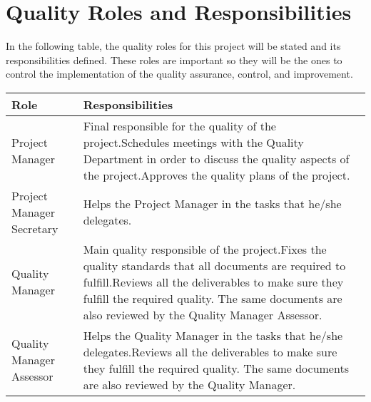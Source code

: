 \section{Quality Roles and Responsibilities}
In the following table, the quality roles for this project will be stated and its responsibilities defined. These roles are important so they will be the ones to control the implementation of the quality assurance, control, and improvement.

\begin{longtable}[H]{>{\raggedright\arraybackslash}p{5cm} p{9cm}}
	
	\toprule[2pt]
	
	\textbf{Role} &  \textbf{Responsibilities}\\
	
	\midrule [1.5pt]
	\endhead
	
	Project Manager & Final responsible for the quality of the project.\vspace{0.3cm}\newline Schedules meetings with the Quality Department in order to discuss the quality aspects of the project.\vspace{0.3cm}\newline Approves the quality plans of the project.\vspace{0.2cm} \\
	
	\midrule
		
	Project Manager Secretary & Helps the Project Manager in the tasks that he/she delegates.\vspace{0.2cm} \\
	
	\midrule
	
	Quality Manager & Main quality responsible of the project.\vspace{0.3cm}\newline Fixes the quality standards that all documents are required to fulfill.\vspace{0.3cm}\newline Reviews all the deliverables to make sure they fulfill the required quality. The same documents are also reviewed by the Quality Manager Assessor.\vspace{0.2cm} \\

	\midrule
	
	Quality Manager Assessor & Helps the Quality Manager in the tasks that he/she delegates.\vspace{0.3cm}\newline Reviews all the deliverables to make sure they fulfill the required quality. The same documents are also reviewed by the Quality Manager.\vspace{0.2cm} \\
	

\end{longtable}
